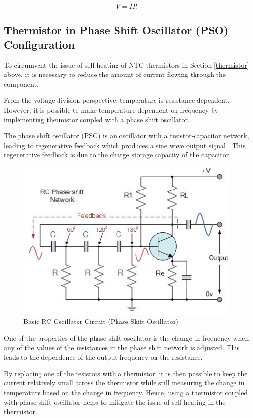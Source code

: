 \begin{equation}
 V=IR
 \label{vir}
\end{equation} 

\subsection{Thermistor in Phase Shift Oscillator (PSO) Configuration}

To circumvent the issue of self-heating of NTC thermistors in Section \ref{thermistor} above, it is necessary to reduce the amount of current flowing through the component. 

From the voltage division perspective, temperature is resistance-dependent. However, it is possible to make temperature dependent on frequency by implementing thermistor coupled with a phase shift oscillator.  

The phase shift oscillator (PSO) is an oscillator with a resistor-capacitor network, leading to regenerative feedback which produces a sine wave output signal \cite{psotutorial}. This regenerative feedback is due to the charge storage capacity of the capacitor \cite{psotutorial}. 

\begin{figure}[H]
	\centering
	\includegraphics[width=0.6\linewidth]{psowebsite.jpg}
	\caption{Basic RC Oscillator Circuit (Phase Shift Oscillator) \cite{psotutorial}}
	\label{psowebsite}
\end{figure}

One of the properties of the phase shift oscillator is the change in frequency when any of the values of the resistances in the phase shift network is adjusted. This leads to the dependence of the output frequency on the resistance.  

By replacing one of the resistors with a thermistor, it is then possible to keep the current relatively small across the thermistor while still measuring the change in temperature based on the change in frequency. Hence, using a thermistor coupled with phase shift oscillator helps to mitigate the issue of self-heating in the thermistor.  

